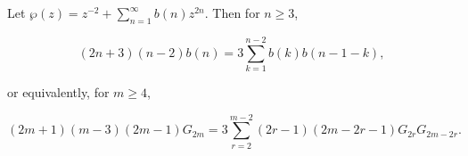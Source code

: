 Let $\wp(z) = z^{-2} + \sum_{n=1}^{\infty} b(n) z^{2n}$. Then for $n \geq 3$,

$$(2n + 3)(n - 2)b(n) = 3 \sum_{k=1}^{n-2} b(k)b(n - 1 - k),$$

or equivalently, for $m \geq 4$,

$$(2m + 1)(m - 3)(2m - 1)G_{2m} = 3 \sum_{r=2}^{m-2}(2r - 1)(2m - 2r - 1)G_{2r}G_{2m-2r}.$$
